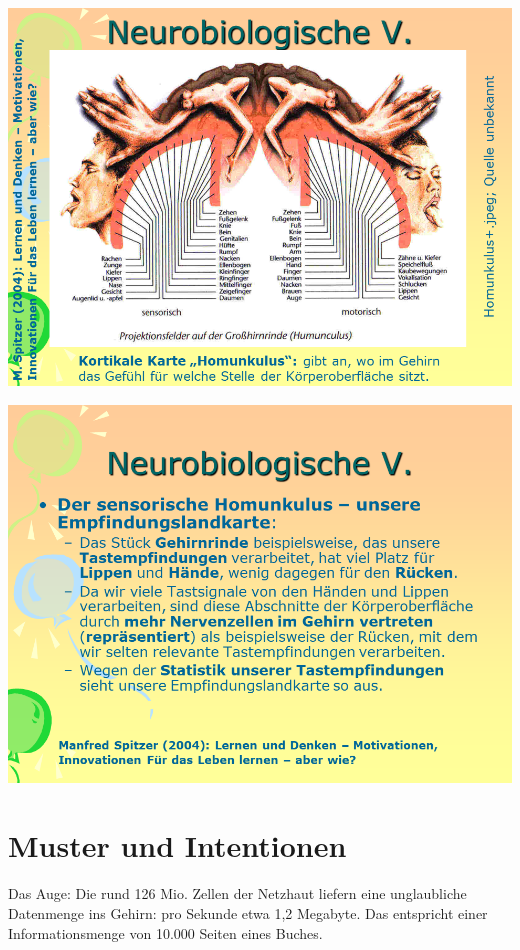 \documentclass[
  letterpaper,
]{scrbook}
\begin{document}
\includegraphics[width=1\textwidth,height=\textheight]{./pictures/neuro/Diapozitiv31.PNG}

\includegraphics[width=1\textwidth,height=\textheight]{./pictures/neuro/Diapozitiv32.PNG}

\hypertarget{muster-und-intentionen}{%
\section{Muster und Intentionen}\label{muster-und-intentionen}}

Das Auge: Die rund 126 Mio. Zellen der Netzhaut liefern eine
unglaubliche Datenmenge ins Gehirn: pro Sekunde etwa 1,2 Megabyte. Das
entspricht einer Informationsmenge von 10.000 Seiten eines Buches.
\end{document}
